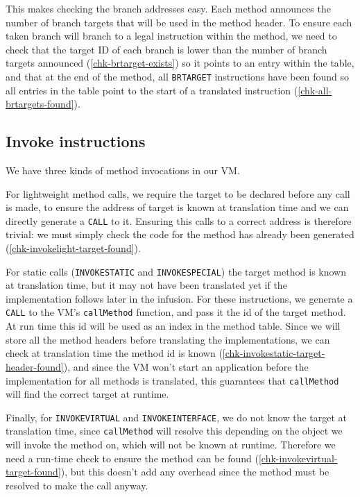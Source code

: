 This makes checking the branch addresses easy. Each method announces the number of branch targets that will be used in the method header. To ensure each taken branch will branch to a legal instruction within the method, we need to check that the target ID of each branch is lower than the number of branch targets announced (\ref{chk-brtarget-exists}) so it points to an entry within the table, and that at the end of the method, all \texttt{BRTARGET} instructions have been found so all entries in the table point to the start of a translated instruction (\ref{chk-all-brtargets-found}).

\subsection{Invoke instructions}
We have three kinds of method invocations in our VM.

For lightweight method calls, we require the target to be declared before any call is made, to ensure the address of target is known at translation time and we can directly generate a \texttt{CALL} to it. Ensuring this calls to a correct address is therefore trivial: we must simply check the code for the method has already been generated (\ref{chk-invokelight-target-found}).

For static calls (\texttt{INVOKESTATIC} and \texttt{INVOKESPECIAL}) the target method is known at translation time, but it may not have been translated yet if the implementation follows later in the infusion. For these instructions, we generate a \texttt{CALL} to the VM's \texttt{callMethod} function, and pass it the id of the target method. At run time this id will be used as an index in the method table. Since we will store all the method headers before translating the implementations, we can check at translation time the method id is known (\ref{chk-invokestatic-target-header-found}), and since the VM won't start an application before the implementation for all methods is translated, this guarantees that \texttt{callMethod} will find the correct target at runtime.

Finally, for \texttt{INVOKEVIRTUAL} and \texttt{INVOKEINTERFACE}, we do not know the target at translation time, since \texttt{callMethod} will resolve this depending on the object we will invoke the method on, which will not be known at runtime. Therefore we need a run-time check to ensure the method can be found (\ref{chk-invokevirtual-target-found}), but this doesn't add any overhead since the method must be resolved to make the call anyway.

